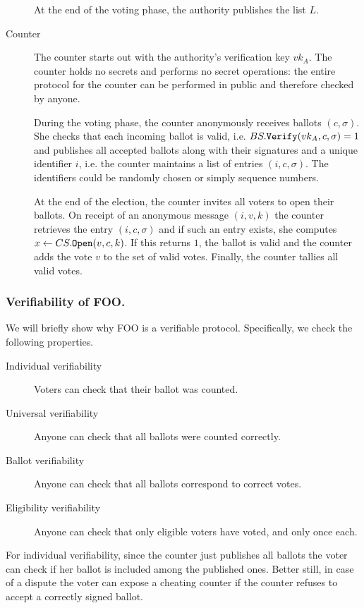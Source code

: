 \documentclass{llncs}
\newcommand{\alg}[1]{\textup{\texttt{#1}}}
\begin{document}
\begin{description}
At the end of the voting phase, the authority publishes the list $L$.

\item[Counter]
The counter starts out with the authority's verification key $vk_A$.
The counter holds no secrets and performs no secret operations: the entire
protocol for the counter can be performed in public and therefore checked by
anyone.

During the voting phase, the counter anonymously receives ballots $(c, \sigma)$.
She checks that each incoming ballot is valid, i.e. $BS.\alg{Verify}(vk_A, c,
\sigma) = 1$ and publishes all accepted ballots along with their signatures and
a unique identifier $i$, i.e. the counter maintains a list of entries $(i, c,
\sigma)$. The identifiers could be randomly chosen or simply sequence numbers.

At the end of the election, the counter invites all voters to open their
ballots. On receipt of an anonymous message $(i, v, k)$ the counter retrieves
the entry $(i, c, \sigma)$ and if such an entry exists, she computes $x \gets
CS.\alg{Open}(v, c, k)$. If this returns $1$, the ballot is valid and the
counter adds the vote $v$ to the set of valid votes. Finally, the counter
tallies all valid votes.
\end{description}

\subsubsection{Verifiability of FOO.}

We will briefly show why FOO is a verifiable protocol. Specifically, we check
the following properties.

\begin{description}
\item[Individual verifiability] Voters can check that their ballot was counted.
\item[Universal verifiability] Anyone can check that all ballots were counted
 correctly.
\item[Ballot verifiability] Anyone can check that all ballots correspond to
 correct votes.
\item[Eligibility verifiability] Anyone can check that only eligible voters have
voted, and only once each.
\end{description}

For individual verifiability, since the counter just publishes all ballots the
voter can check if her ballot is included among the published ones. Better
still, in case of a dispute the voter can expose a cheating counter if the
counter refuses to accept a correctly signed ballot.
\end{document}
